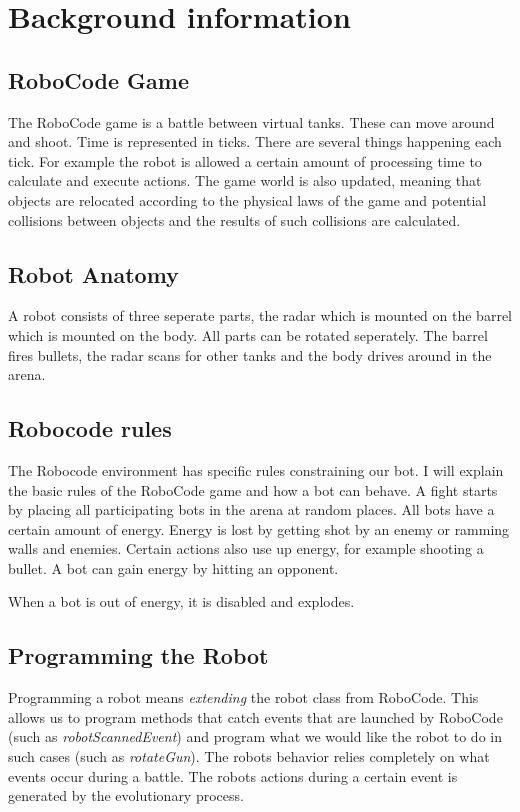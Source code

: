 \documentclass[a4paper,10pt]{article}
\begin{document}
\section{Background information}
\label{bi}
\subsection{RoboCode Game}
The RoboCode game is a battle between virtual tanks. These can move around and shoot. Time is represented in ticks. There are several things happening each tick. For example the robot is allowed a certain amount of processing time to calculate and execute actions. The game world is also updated, meaning that objects are relocated according to the physical laws of the game and potential collisions between objects and the results of such collisions are calculated.

\subsection{Robot Anatomy}
A robot consists of three seperate parts, the radar which is mounted on the barrel which is mounted on the body. All parts can be rotated seperately. The barrel fires bullets, the radar scans for other tanks and the body drives around in the arena. 

\subsection{Robocode rules}
The Robocode environment has specific rules constraining our bot. I will explain the basic rules of the RoboCode game and how a bot can behave.
A fight starts by placing all participating bots in the arena at random places. All bots have a certain amount of energy. Energy is lost by getting shot by an enemy or ramming walls and enemies. Certain actions also use up energy, for example shooting a bullet.
A bot can gain energy by hitting an opponent.

When a bot is out of energy, it is disabled and explodes.

\subsection{Programming the Robot}
Programming a robot means \textit{extending} the robot class from RoboCode. This allows us to program methods that catch events that are launched by RoboCode (such as \textit{robotScannedEvent}) and program what we would like the robot to do in such cases (such as \textit{rotateGun}). The robots behavior relies completely on what events occur during a battle. The robots actions during a certain event is generated by the evolutionary process. 
\end{document}
